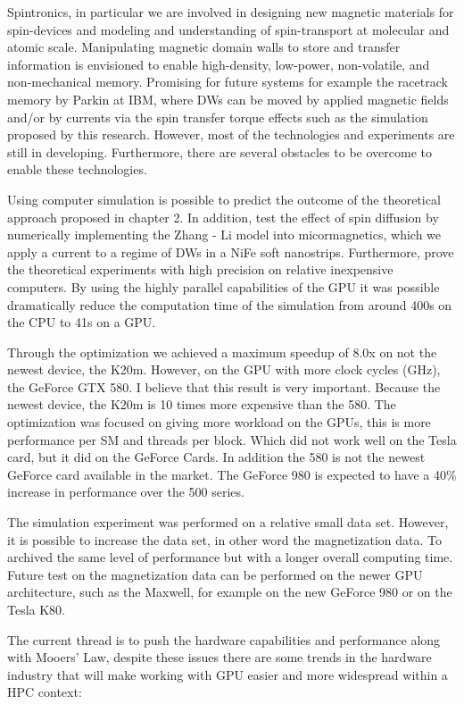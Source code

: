 Spintronics, in particular we are involved in designing new magnetic materials for spin-devices and modeling and understanding of spin-transport at molecular and atomic scale. Manipulating magnetic domain walls to store and transfer information is envisioned to enable high-density, low-power, non-volatile, and non-mechanical memory. Promising for future systems for example the racetrack memory by Parkin at IBM, where DWs can be moved by applied magnetic fields and/or by currents via the spin transfer torque effects such as the simulation proposed by this research. However, most of the technologies and experiments  are still in developing. Furthermore, there are several obstacles to be overcome to enable these technologies.

Using computer simulation is possible to predict the outcome of the theoretical approach proposed in chapter 2. In addition, test the effect of spin diffusion by numerically implementing the Zhang - Li model into micormagnetics, which we apply a current to a regime of DWs in a NiFe soft nanostrips. Furthermore, prove the theoretical experiments with high precision on relative inexpensive computers. By using the highly parallel capabilities of the GPU it was possible dramatically reduce the computation time of the simulation from around 400s on the CPU to 41s on a GPU.

Through the optimization we achieved a maximum speedup of 8.0x on not the newest device, the K20m. However, on the GPU with more clock cycles (GHz), the GeForce GTX 580. I believe that this result is very important. Because the newest device, the K20m is 10 times more expensive than the 580. The optimization was focused on giving more workload on the GPUs, this is more performance per SM and threads per block. Which did not work well on the Tesla card, but it did on the GeForce Cards. In addition the 580 is not the newest GeForce card available in the market. The GeForce 980 is expected to have a 40$\%$ increase in performance over the 500 series. 

The simulation experiment was performed on a relative small data set. However, it is possible to increase the data set, in other word the magnetization data. To archived the same level of performance but with a longer overall computing time. Future test on the magnetization data can be performed on the newer GPU architecture, such as the Maxwell, for example on the new GeForce 980 or on the Tesla K80.

The current thread is to push the hardware capabilities and performance along with Mooers' Law, despite these issues there are some trends in the hardware industry that will make working with GPU easier and more widespread within a HPC context:

